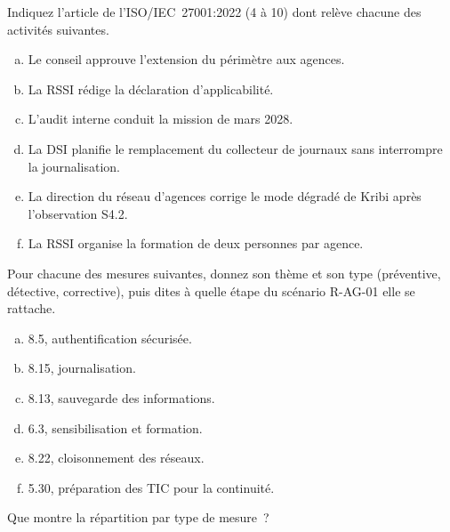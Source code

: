 \begin{boxexo}[title={\ding{45}\quad Exercice~8.1. Quel article~? \niveaubase}]
Indiquez l'article de l'ISO/IEC~27001:2022 (4 à 10) dont relève chacune des
activités suivantes.
\begin{enumerate}[(a)]
    \item Le conseil approuve l'extension du périmètre aux agences.
    \item La RSSI rédige la déclaration d'applicabilité.
    \item L'audit interne conduit la mission de mars 2028.
    \item La DSI planifie le remplacement du collecteur de journaux sans
          interrompre la journalisation.
    \item La direction du réseau d'agences corrige le mode dégradé de Kribi
          après l'observation S4.2.
    \item La RSSI organise la formation de deux personnes par agence.
\end{enumerate}
\end{boxexo}

\begin{boxexo}[title={\ding{45}\quad Exercice~8.2. Thèmes et attributs \niveaumoyen}]
Pour chacune des mesures suivantes, donnez son thème et son type
(préventive, détective, corrective), puis dites à quelle étape du scénario
R-AG-01 elle se rattache.
\begin{enumerate}[(a)]
    \item 8.5, authentification sécurisée.
    \item 8.15, journalisation.
    \item 8.13, sauvegarde des informations.
    \item 6.3, sensibilisation et formation.
    \item 8.22, cloisonnement des réseaux.
    \item 5.30, préparation des TIC pour la continuité.
\end{enumerate}
Que montre la répartition par type de mesure~?
\end{boxexo}

